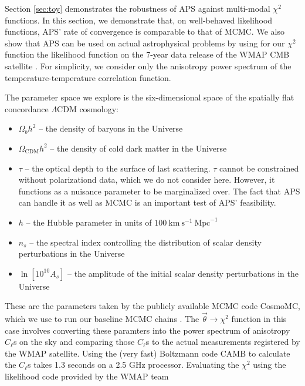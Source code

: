 \documentclass[useAMS,usenatbib]{aastex}
\begin{document}
Section \ref{sec:toy} demonstrates the robustness of APS against multi-modal
$\chi^2$ functions.  In this section, we demonstrate 
that, on well-behaved likelihood functions, APS' rate of convergence is
comparable to that of MCMC.  
We also show that APS can be used on actual astrophysical
problems by using for our $\chi^2$ function the likelihood function on the
7-year data release of the WMAP CMB satellite \cite{wmap7,wmap7likelihood}.
For simplicity, we consider only the anisotropy
power spectrum of the temperature-temperature correlation function.

The parameter space we explore is the six-dimensional space of the spatially
flat concordance $\Lambda$CDM cosmology:
\begin{itemize}
\item$\Omega_bh^2$ -- the density of baryons in the Universe
\\
\item$\Omega_\text{CDM}h^2$ -- the density of cold dark matter in the Universe
\\
\item$\tau$ -- the optical depth to the surface of last scattering.  $\tau$ cannot be
constrained without polarizationd data, which we do not consider here.  However, it functions
as a nuisance parameter to be marginalized over.  The fact that APS can handle it as well as
MCMC is an important test of APS' feasibility.
\\
\item$h$ -- the Hubble parameter in units of
$100~\text{km}~\text{s}^{-1}~\text{Mpc}^{-1}$
\\
\item$n_s$ -- the spectral index controlling the distribution of scalar density
perturbations in the Universe
\\
\item$\ln[10^{10}A_s]$ -- the amplitude of the initial scalar density
perturbations in the Universe
\end{itemize}
These are the parameters taken by the publicly available MCMC code CosmoMC,
which we use to run our baseline MCMC chains \cite{cosmomc}.  The
$\vec{\theta}\rightarrow\chi^2$ function in this case involves converting these
paramters into the power spectrum of anisotropy $C_\ell$s on the sky and
comparing those $C_\ell$s to the actual measurements registered by the WMAP
satellite.  Using the (very fast) Boltzmann code CAMB to calculate the $C_\ell$s
\cite{camb} takes 1.3 seconds on a 2.5 GHz processor.  
Evaluating the $\chi^2$ using the likelihood code provided by the WMAP team
\end{document}
